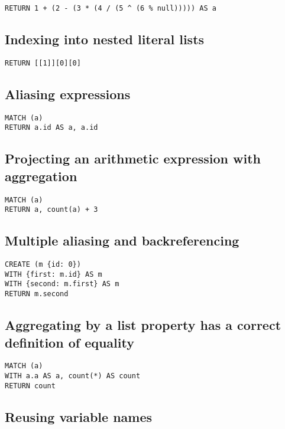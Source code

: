\begin{lstlisting}
RETURN 1 + (2 - (3 * (4 / (5 ^ (6 % null))))) AS a
\end{lstlisting}

\subsection{Indexing into nested literal lists}

\begin{lstlisting}
RETURN [[1]][0][0]
\end{lstlisting}

\subsection{Aliasing expressions}

\begin{lstlisting}
MATCH (a)
RETURN a.id AS a, a.id
\end{lstlisting}

\subsection{Projecting an arithmetic expression with aggregation}

\begin{lstlisting}
MATCH (a)
RETURN a, count(a) + 3
\end{lstlisting}

\subsection{Multiple aliasing and backreferencing}

\begin{lstlisting}
CREATE (m {id: 0})
WITH {first: m.id} AS m
WITH {second: m.first} AS m
RETURN m.second
\end{lstlisting}

\subsection{Aggregating by a list property has a correct definition of equality}

\begin{lstlisting}
MATCH (a)
WITH a.a AS a, count(*) AS count
RETURN count
\end{lstlisting}

\subsection{Reusing variable names}

